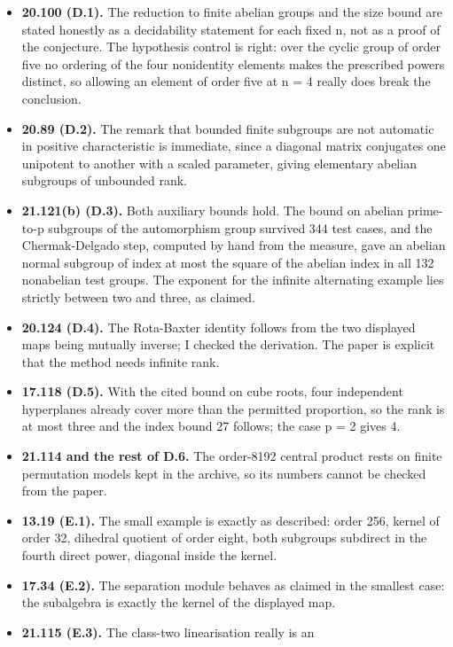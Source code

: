 \begin{itemize}
\tightlist
\item
  \textbf{20.100 (D.1).} The reduction to finite abelian groups and the
  size bound are stated honestly as a decidability statement for each
  fixed n, not as a proof of the conjecture. The hypothesis control is
  right: over the cyclic group of order five no ordering of the four
  nonidentity elements makes the prescribed powers distinct, so allowing
  an element of order five at n = 4 really does break the conclusion.
\item
  \textbf{20.89 (D.2).} The remark that bounded finite subgroups are not
  automatic in positive characteristic is immediate, since a diagonal
  matrix conjugates one unipotent to another with a scaled parameter,
  giving elementary abelian subgroups of unbounded rank.
\item
  \textbf{21.121(b) (D.3).} Both auxiliary bounds hold. The bound on
  abelian prime-to-p subgroups of the automorphism group survived 344
  test cases, and the Chermak-Delgado step, computed by hand from the
  measure, gave an abelian normal subgroup of index at most the square
  of the abelian index in all 132 nonabelian test groups. The exponent
  for the infinite alternating example lies strictly between two and
  three, as claimed.
\item
  \textbf{20.124 (D.4).} The Rota-Baxter identity follows from the two
  displayed maps being mutually inverse; I checked the derivation. The
  paper is explicit that the method needs infinite rank.
\item
  \textbf{17.118 (D.5).} With the cited bound on cube roots, four
  independent hyperplanes already cover more than the permitted
  proportion, so the rank is at most three and the index bound 27
  follows; the case p = 2 gives 4.
\item
  \textbf{21.114 and the rest of D.6.} The order-8192 central product
  rests on finite permutation models kept in the archive, so its numbers
  cannot be checked from the paper.
\item
  \textbf{13.19 (E.1).} The small example is exactly as described: order
  256, kernel of order 32, dihedral quotient of order eight, both
  subgroups subdirect in the fourth direct power, diagonal inside the
  kernel.
\item
  \textbf{17.34 (E.2).} The separation module behaves as claimed in the
  smallest case: the subalgebra is exactly the kernel of the displayed
  map.
\item
  \textbf{21.115 (E.3).} The class-two linearisation really is an

\end{itemize}
